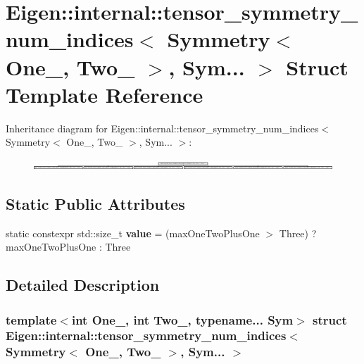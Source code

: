 \hypertarget{struct_eigen_1_1internal_1_1tensor__symmetry__num__indices_3_01_symmetry_3_01_one___00_01_two___01_4_00_01_sym_8_8_8_01_4}{}\section{Eigen\+:\+:internal\+:\+:tensor\+\_\+symmetry\+\_\+num\+\_\+indices$<$ Symmetry$<$ One\+\_\+, Two\+\_\+ $>$, Sym... $>$ Struct Template Reference}
\label{struct_eigen_1_1internal_1_1tensor__symmetry__num__indices_3_01_symmetry_3_01_one___00_01_two___01_4_00_01_sym_8_8_8_01_4}
Inheritance diagram for Eigen\+:\+:internal\+:\+:tensor\+\_\+symmetry\+\_\+num\+\_\+indices$<$ Symmetry$<$ One\+\_\+, Two\+\_\+ $>$, Sym... $>$\+:\begin{figure}[H]
\begin{center}
\leavevmode
\includegraphics[height=0.357599cm]{struct_eigen_1_1internal_1_1tensor__symmetry__num__indices_3_01_symmetry_3_01_one___00_01_two___01_4_00_01_sym_8_8_8_01_4}
\end{center}
\end{figure}
\subsection*{Static Public Attributes}
\begin{DoxyCompactItemize}
\item 
\mbox{\label{struct_eigen_1_1internal_1_1tensor__symmetry__num__indices_3_01_symmetry_3_01_one___00_01_two___01_4_00_01_sym_8_8_8_01_4_a4295fe9eae3dd76d4bd90b6be015e63e}} 
static constexpr std\+::size\+\_\+t {\bfseries value} = (max\+One\+Two\+Plus\+One $>$ Three) ? max\+One\+Two\+Plus\+One \+: Three
\end{DoxyCompactItemize}


\subsection{Detailed Description}
\subsubsection*{template$<$int One\+\_\+, int Two\+\_\+, typename... Sym$>$\newline
struct Eigen\+::internal\+::tensor\+\_\+symmetry\+\_\+num\+\_\+indices$<$ Symmetry$<$ One\+\_\+, Two\+\_\+ $>$, Sym... $>$}



